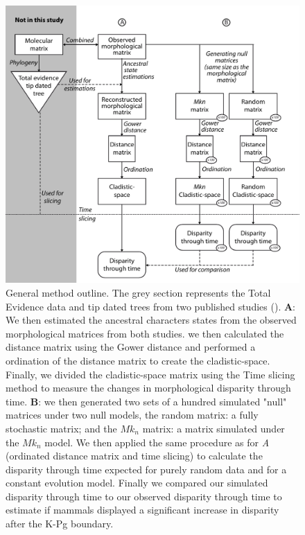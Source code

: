 \documentclass[12pt,letterpaper]{article}
\begin{document}
\begin{figure}[!htbp]
\centering
    \includegraphics[keepaspectratio=true]{Figures/MEthod_outline.pdf}
\caption{General method outline. The grey section represents the Total Evidence data and tip dated trees from two published studies (\cite{MEE3:MEE312084,beckancient2014}). \textbf{A}: We then estimated the ancestral characters states from the observed morphological matrices from both studies. we then calculated the distance matrix using the Gower distance \cite{Gower71} and performed a ordination of the distance matrix to create the cladistic-space. Finally, we divided the cladistic-space matrix using the Time slicing method to measure the changes in morphological disparity through time. \textbf{B}: we then generated two sets of a hundred simulated "null" matrices under two null models, the random matrix: a fully stochastic matrix; and the $Mk_n$ matrix: a matrix simulated under the $Mk_n$ model. We then applied the same procedure as for \textit{A} (ordinated distance matrix and time slicing) to calculate the disparity through time expected for purely random data and for a constant evolution model. Finally we compared our simulated disparity through time to our observed disparity through time to estimate if mammals displayed a significant increase in disparity after the K-Pg boundary.}
\label{fig_method}
\end{figure}
\end{document}
